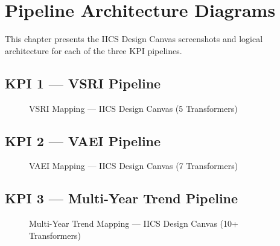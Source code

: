 \documentclass[12pt,a4paper]{report}
\begin{document}
\chapter{Pipeline Architecture Diagrams}

This chapter presents the IICS Design Canvas screenshots and logical architecture for each of the three KPI pipelines.

\section{KPI 1 — VSRI Pipeline}

\begin{figure}[h!]
  \centering
  \caption{VSRI Mapping — IICS Design Canvas (5 Transformers)}
  \label{fig:vsri}
\end{figure}

\section{KPI 2 — VAEI Pipeline}

\begin{figure}[h!]
  \centering
  \caption{VAEI Mapping — IICS Design Canvas (7 Transformers)}
  \label{fig:vaei}
\end{figure}

\section{KPI 3 — Multi-Year Trend Pipeline}

\begin{figure}[h!]
  \centering
  \caption{Multi-Year Trend Mapping — IICS Design Canvas (10+ Transformers)}
  \label{fig:trend}
\end{figure}
\end{document}
